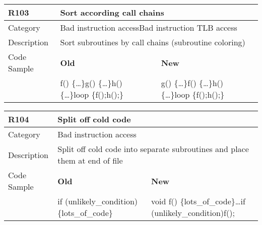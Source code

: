 \begin{tabular}{|p{0.9in}|p{2.0in}|p{2.0in}|} \hline
\textbf{R103}       & \multicolumn{2}{|p{4.0in}|}{\textbf{Sort according call chains}} \\ \hline
Category            & \multicolumn{2}{|p{4.0in}|}{Bad instruction access\newline Bad instruction TLB access} \\ \hline
Description         & \multicolumn{2}{|p{4.0in}|}{Sort subroutines by call chains (subroutine coloring)} \\ \hline
Code Sample         & \textbf{Old} & \textbf{New} \\ \hline
                    & f() \{\ldots\}\newline g() \{\ldots\}\newline h() \{\ldots\}\newline loop \{\newline   f();\newline   h();\newline \}
                    & g() \{\ldots\}\newline f() \{\ldots\}\newline h() \{\ldots\}\newline loop \{\newline   f();\newline   h();\newline \} \\ \hline
\end{tabular}

\begin{tabular}{|p{0.9in}|p{2.0in}|p{2.0in}|} \hline
\textbf{R104}       & \multicolumn{2}{|p{4.0in}|}{\textbf{Split off cold code}} \\ \hline
Category            & \multicolumn{2}{|p{4.0in}|}{Bad instruction access} \\ \hline
Description         & \multicolumn{2}{|p{4.0in}|}{Split off cold code into separate subroutines and place them at end of file} \\ \hline
Code Sample         & \textbf{Old} & \textbf{New} \\ \hline
                    & if (unlikely\_condition) \{\newline   lots\_of\_code\newline \}
                    & void f() \{lots\_of\_code\}\newline \ldots\newline if (unlikely\_condition)\newline   f(); \\ \hline
\end{tabular}

